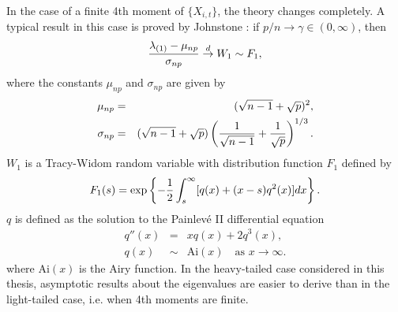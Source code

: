 In the case of a finite 4th moment of $\{X_{i,t}\}$, the theory
changes completely. A typical result in this case is proved by
Johnstone \cite{johnstone:2001}: if $p/n \to \gamma \in (0, \infty)$,
then
\[
{\lambda_{(1)} - \mu_{np} \over \sigma_{np}}
\overset{d}{\to}
W_1 \sim F_1,
\]
where the constants $\mu_{np}$ and $\sigma_{np}$ are given by
\begin{eqnarray*}
  \mu_{np} &=& (\sqrt{n-1} + \sqrt p)^2, \\
  \sigma_{np} &=& (\sqrt{n-1} + \sqrt p)
  \left(
    {1 \over \sqrt{n - 1}} + {1 \over \sqrt p}
  \right)^{1/3}.
\end{eqnarray*}
$W_1$ is a Tracy-Widom random variable with distribution
function $F_1$ defined by
\[
F_1(s) = \exp \left\{
  -{1 \over 2} \int_s^\infty
  [q(x) + (x - s) q^2(x)] dx
\right\}.
\]
$q$ is defined as the solution to the Painlevé II differential
equation
\begin{eqnarray*}
  q''(x) &=& x q(x) + 2 q^3(x), \\
q(x) &\sim& \text{Ai}(x)
\quad \text{as } x \to \infty.
\end{eqnarray*}
where $\text{Ai}(x)$ is the Airy function.
In the heavy-tailed case considered in this thesis, asymptotic results
about the eigenvalues are easier to derive than in the light-tailed
case, i.e. when 4th moments are finite.


